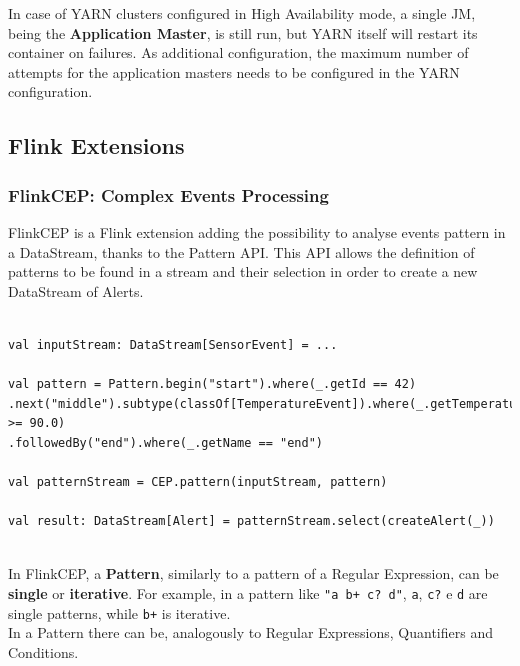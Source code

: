 In case of YARN clusters configured in High Availability mode, a single JM, being the \textbf{Application Master}, is still run, but YARN itself will restart its container on failures. As additional configuration, the maximum number of attempts for the application masters needs to be configured in the YARN configuration.

\subsection{Flink Extensions} \label{FlinkLibs}

\subsubsection{FlinkCEP: Complex Events Processing}

FlinkCEP is a Flink extension adding the possibility to analyse events pattern in a DataStream, thanks to the Pattern API. This API allows the definition of patterns to be found in a stream and their selection in order to create a new DataStream of Alerts.\\


\begin{code}
\label{code:pattern-example}
\begin{verbatim}

val inputStream: DataStream[SensorEvent] = ...

val pattern = Pattern.begin("start").where(_.getId == 42)
.next("middle").subtype(classOf[TemperatureEvent]).where(_.getTemperature >= 90.0)
.followedBy("end").where(_.getName == "end")

val patternStream = CEP.pattern(inputStream, pattern)

val result: DataStream[Alert] = patternStream.select(createAlert(_))
\end{verbatim}
\end{code}~\\

In FlinkCEP, a \textbf{Pattern}, similarly to a pattern of a Regular Expression, can be \textbf{single} or \textbf{iterative}. For example, in a pattern like \texttt{"a b+ c? d"}, \texttt{a}, \texttt{c?} e \texttt{d} are single patterns, while \texttt{b+} is iterative.
\\

In a Pattern there can be, analogously to Regular Expressions, Quantifiers and Conditions.

